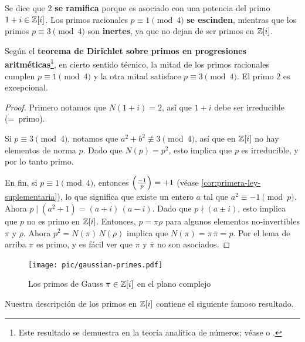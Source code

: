 Se dice que $2$ \textbf{se ramifica} porque es asociado con una potencia del
primo $1+i \in \mathbb{Z} [i]$. Los primos racionales $p \equiv 1 \pmod{4}$
\textbf{se escinden}, mientras que los primos $p \equiv 3 \pmod{4}$ son
\textbf{inertes}, ya que no dejan de ser primos en $\mathbb{Z} [i]$.

Según el \textbf{teorema de Dirichlet sobre primos en progresiones
  aritméticas}\footnote{Este resultado se demuestra en la teoría analítica de
  números; véase \cite[Chapter~16]{Ireland-Rosen} o
  \cite[Chapter~7]{Apostol-analytic}.}, en cierto sentido técnico, la mitad de
los primos racionales cumplen $p \equiv 1 \pmod{4}$ y la otra mitad satisface
$p \equiv 3 \pmod{4}$. El primo $2$ es excepcional.

\begin{proof}
  Primero notamos que $N (1+i) = 2$, así que $1 + i$ debe ser irreducible
  (=~primo).
 
  Si $p \equiv 3 \pmod{4}$, notamos que $a^2 + b^2 \not\equiv 3 \pmod{4}$, así
  que en $\mathbb{Z} [i]$ no hay elementos de norma $p$. Dado que $N (p) = p^2$, esto
  implica que $p$ es irreducible, y por lo tanto primo.

  En fin, si $p \equiv 1 \pmod{4}$, entonces $\left(\frac{-1}{p}\right) = +1$ (véase
  \ref{cor:primera-ley-suplementaria}), lo que significa que existe un entero
  $a$ tal que $a^2 \equiv -1 \pmod{p}$. Ahora
  $p \mid (a^2 + 1) = (a + i)\,(a - i)$. Dado que $p \nmid (a \pm i)$, esto
  implica que $p$ no es primo en $\mathbb{Z} [i]$. Entonces, $p = \pi\rho$ para algunos
  elementos no-invertibles $\pi$ y $\rho$.  Ahora $p^2 = N (\pi) \, N (\rho)$
  implica que $N (\pi) = \pi\,\overline{\pi} = p$. Por el lema de arriba $\pi$
  es primo, y es fácil ver que $\pi$ y $\overline{\pi}$ no son asociados.
\end{proof}

\begin{figure}
  \begin{center}
    \texttt{[image: pic/gaussian-primes.pdf]}
  \end{center}

  \caption{Los primos de Gauss $\pi \in \mathbb{Z} [i]$ en el plano complejo}
\end{figure}

Nuestra descripción de los primos en $\mathbb{Z} [i]$ contiene el siguiente famoso
resultado.

